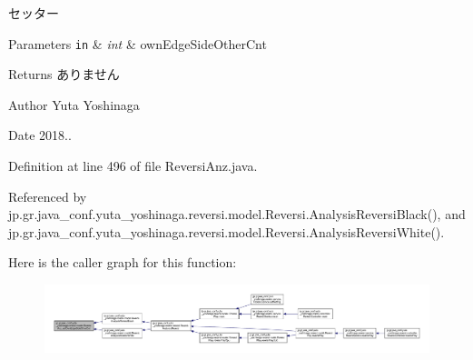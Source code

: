 セッター 


\begin{DoxyParams}[1]{Parameters}
\mbox{\tt in}  & {\em int} & own\+Edge\+Side\+Other\+Cnt \\
\hline
\end{DoxyParams}
\begin{DoxyReturn}{Returns}
ありません 
\end{DoxyReturn}
\begin{DoxyAuthor}{Author}
Yuta Yoshinaga 
\end{DoxyAuthor}
\begin{DoxyDate}{Date}
2018.. 
\end{DoxyDate}


Definition at line 496 of file Reversi\+Anz.\+java.



Referenced by jp.\+gr.\+java\+\_\+conf.\+yuta\+\_\+yoshinaga.\+reversi.\+model.\+Reversi.\+Analysis\+Reversi\+Black(), and jp.\+gr.\+java\+\_\+conf.\+yuta\+\_\+yoshinaga.\+reversi.\+model.\+Reversi.\+Analysis\+Reversi\+White().

Here is the caller graph for this function\+:
\nopagebreak
\begin{figure}[H]
\begin{center}
\leavevmode
\includegraphics[width=350pt]{classjp_1_1gr_1_1java__conf_1_1yuta__yoshinaga_1_1reversi_1_1model_1_1_reversi_anz_ac636e4020b682188e70e3b983fd3d4e4_icgraph}
\end{center}
\end{figure}
\mbox{\label{classjp_1_1gr_1_1java__conf_1_1yuta__yoshinaga_1_1reversi_1_1model_1_1_reversi_anz_a0ce858afa1508c93ca52c33fa4eb2f32}} 
